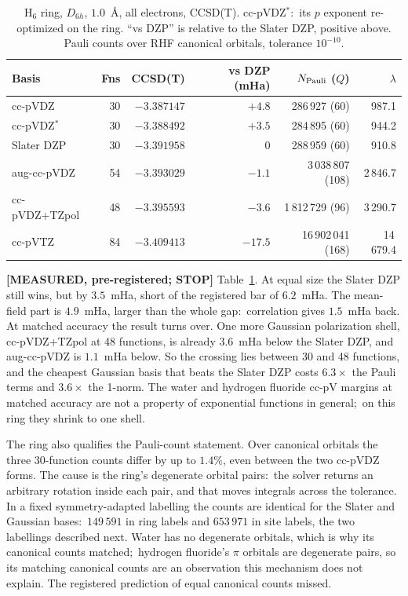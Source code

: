 \documentclass[aps,pra,twocolumn,superscriptaddress,longbibliography]{revtex4-2}
\newcommand{\gvc}[2]{#2}
\begin{document}
\begin{table}[t]
\caption{H$_6$ ring, $D_{6h}$, $1.0$~\AA, all electrons, CCSD(T).
cc-pVDZ$^*$:\ its $p$ exponent re-optimized on the ring.  ``vs DZP'' is
relative to the Slater DZP, positive above.  Pauli counts over RHF
canonical orbitals, tolerance $10^{-10}$.}
\label{tab:hring}
\begin{ruledtabular}
\begin{tabular}{lrrrrr}
Basis & Fns & CCSD(T) & vs DZP (mHa) & $N_{\rm Pauli}$ ($Q$) & $\lambda$ \\
\hline
cc-pVDZ & 30 & $-3.387147$ & $+4.8$ & 286\,927 (60) & 987.1 \\
cc-pVDZ$^*$ & 30 & $-3.388492$ & $+3.5$ & 284\,895 (60) & 944.2 \\
Slater DZP & 30 & $-3.391958$ & $0$ & 288\,959 (60) & 910.8 \\
aug-cc-pVDZ & 54 & $-3.393029$ & $-1.1$ & 3\,038\,807 (108) & 2\,846.7 \\
cc-pVDZ+TZpol & 48 & $-3.395593$ & $-3.6$ & 1\,812\,729 (96) & 3\,290.7 \\
cc-pVTZ & 84 & $-3.409413$ & $-17.5$ & 16\,902\,041 (168) & 14\,679.4 \\
\end{tabular}
\end{ruledtabular}
\end{table}

\textbf{[MEASURED, pre-registered; STOP]}  Table~\ref{tab:hring}.  At equal
size the Slater DZP still wins, but by $3.5$~mHa, short of the registered
bar of $6.2$~mHa.  The mean-field part is $4.9$~mHa, larger than the whole
gap:\ correlation gives $1.5$~mHa back.  At matched accuracy the result
turns over.  One more Gaussian polarization shell, cc-pVDZ+TZpol at 48
functions, is already $3.6$~mHa below the Slater DZP, and aug-cc-pVDZ is
$1.1$~mHa below.  So the crossing lies between 30 and 48 functions, and the
cheapest Gaussian basis that beats the Slater DZP costs $6.3\times$ the
Pauli terms and $3.6\times$ the 1-norm.  \gvc{p62-hring-contrast}{The water and hydrogen fluoride cc-pV
margins at matched accuracy are not a property of exponential functions in
general};\ on this ring they shrink to one shell.

The ring also qualifies the Pauli-count statement.  Over canonical orbitals
the three 30-function counts differ by up to $1.4\%$, even between the two
cc-pVDZ forms.  The cause is the ring's degenerate orbital pairs:\ the
solver returns an arbitrary rotation inside each pair, and that moves
integrals across the tolerance.  In a fixed symmetry-adapted labelling the
counts are identical for the Slater and Gaussian bases:\ $149\,591$ in ring
labels and $653\,971$ in site labels, the two labellings described next.  Water has no degenerate orbitals, which is why its canonical counts
matched;\ hydrogen fluoride's $\pi$ orbitals are degenerate pairs, so its matching
canonical counts are an observation this mechanism does not explain.  The registered prediction of equal canonical counts missed.
\end{document}
